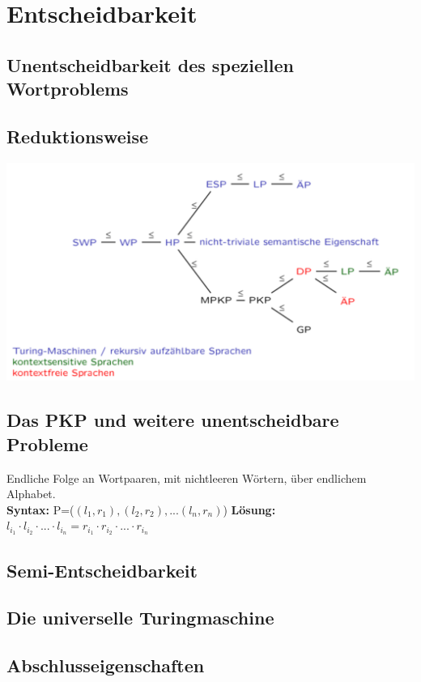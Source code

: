 \documentclass[12pt,a4paper]{article}
\begin{document}
\section{Entscheidbarkeit}
	\subsection{Unentscheidbarkeit des speziellen Wortproblems}

	\subsection{Reduktionsweise}
	\includegraphics[scale=0.4]{Bilder/Zusammenfassung_Unentscheidbarkeiten.png}

	\subsection{Das PKP und weitere unentscheidbare Probleme}
	Endliche Folge an Wortpaaren, mit nichtleeren Wörtern, über endlichem Alphabet.\\
	\textbf{Syntax:} P=($(l_1, r_1), (l_2, r_2), ...(l_n, r_n)$) \hfill \textbf{Lösung:} $l_{i_1} \cdot l_{i_2} \cdot ... \cdot l_{i_n} = r_{i_1} \cdot r_{i_2} \cdot ... \cdot r_{i_n}$

	\subsection{Semi-Entscheidbarkeit}
	
	\subsection{Die universelle Turingmaschine}

	\subsection{Abschlusseigenschaften}
\end{document}
